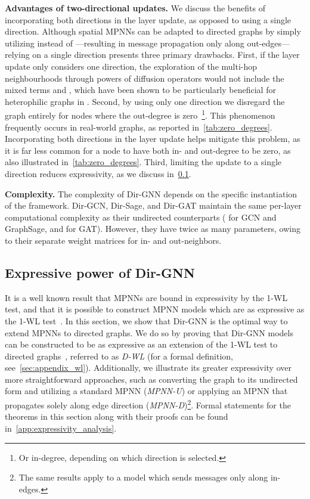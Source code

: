 \documentclass{article}
\newcommand\oursacro{Dir-GNN}
\theoremstyle{plain}
\theoremstyle{definition}
\theoremstyle{remark}
\begin{document}
\textbf{Advantages of two-directional updates.} We discuss the benefits of incorporating both directions in the layer update, as opposed to using a single direction. Although spatial MPNNs can be adapted to directed graphs by simply utilizing  instead of —resulting in message propagation only along out-edges—relying on a single direction presents three primary drawbacks. 
First, if the layer update only considers one direction, the exploration of the multi-hop neighbourhoods through powers of diffusion operators would not include the mixed terms  and , which have been shown to be particularly beneficial for heterophilic graphs in .
Second, by using only one direction we disregard the graph entirely for nodes where the out-degree is zero~\footnote{Or in-degree, depending on which direction is selected.}. This phenomenon frequently occurs in real-world graphs, as reported in~\cref{tab:zero_degrees}. Incorporating both directions in the layer update helps mitigate this problem, as it is far less common for a node to have both in- and out-degree to be zero, as also illustrated in~\cref{tab:zero_degrees}.
Third, limiting the update to a single direction reduces expressivity, as we discuss in~\cref{sec:expressivity}.

\textbf{Complexity.}
The complexity of \oursacro{} depends on the specific instantiation of the framework. Dir-GCN, Dir-Sage, and Dir-GAT maintain the same per-layer computational complexity as their undirected counterparts ( for GCN and GraphSage, and  for GAT). However, they have twice as many parameters, owing to their separate weight matrices for in- and out-neighbors.

\subsection{Expressive power of \oursacro{}} \label{sec:expressivity}
It is a well known result that MPNNs are bound in expressivity by the 1-WL test, and that it is possible to construct MPNN models which are as expressive as the 1-WL test~\cite{DBLP:conf/iclr/XuHLJ19}. In this section, we show that \oursacro{} is the optimal way to extend MPNNs to directed graphs. We do so by proving that \oursacro{} models can be constructed to be as expressive as an extension of the 1-WL test to directed graphs~\cite{Grohe2021ColorRA}, referred to as \textit{D-WL} (for a formal definition, see~\cref{sec:appendix_wl}). Additionally, we illustrate its greater expressivity over more straightforward approaches, such as converting the graph to its undirected form and utilizing a standard MPNN (\textit{MPNN-U}) or applying an MPNN that propagates solely along edge direction (\textit{MPNN-D})\footnote{The same results apply to a model which sends messages only along in-edges.}. Formal statements for the theorems in this section along with their proofs can be found in~\cref{app:expressivity_analysis}. 
\end{document}

